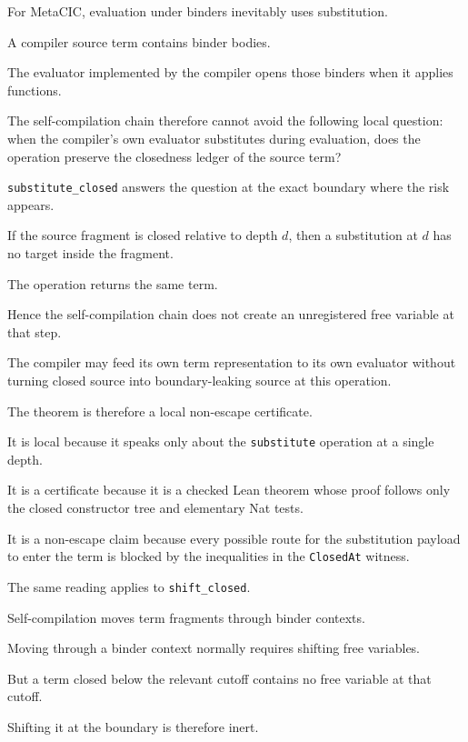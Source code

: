 For MetaCIC, evaluation under binders inevitably uses substitution.

A compiler source term contains binder bodies.

The evaluator implemented by the compiler opens those binders when it applies
functions.

The self-compilation chain therefore cannot avoid the following local question:
when the compiler's own evaluator substitutes during evaluation, does the
operation preserve the closedness ledger of the source term?

\texttt{substitute\_closed} answers the question at the exact boundary where the
risk appears.

If the source fragment is closed relative to depth $d$, then a substitution at
$d$ has no target inside the fragment.

The operation returns the same term.

Hence the self-compilation chain does not create an unregistered free variable
at that step.

The compiler may feed its own term representation to its own evaluator without
turning closed source into boundary-leaking source at this operation.

The theorem is therefore a local non-escape certificate.


It is local because it speaks only about the \texttt{substitute} operation at a
single depth.

It is a certificate because it is a checked Lean theorem whose proof follows
only the closed constructor tree and elementary Nat tests.

It is a non-escape claim because every possible route for the substitution
payload to enter the term is blocked by the inequalities in the
\texttt{ClosedAt} witness.

The same reading applies to \texttt{shift\_closed}.

Self-compilation moves term fragments through binder contexts.

Moving through a binder context normally requires shifting free variables.

But a term closed below the relevant cutoff contains no free variable at that
cutoff.

Shifting it at the boundary is therefore inert.

